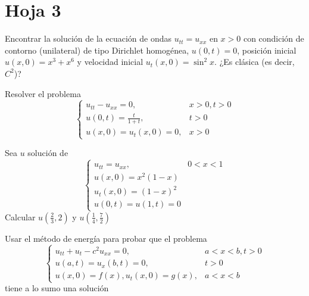 \section{Hoja 3}

\begin{problem}[1] Encontrar la solución de la ecuación de ondas $ u_{tt} = u_{xx} $ en $ x>0 $ con condición de contorno (unilateral) de tipo Dirichlet homogénea, $ u(0,t)=0 $, posición inicial $ u(x,0)=x^3+x^6 $ y velocidad inicial $ u_t(x,0)=\sin^2x $. ¿Es clásica (es decir, $ C^2 $)?

\solution

\end{problem}





\begin{problem}[2] Resolver el problema \[ \begin{cases}
	u_{tt} - u_{xx} = 0,    & x>0, t>0 \\
	u(0,t) = \frac{t}{1+t}, & t>0 \\
	u(x,0)=u_t(x,0)=0 ,     & x>0
\end{cases} \]

\solution

\end{problem}





\begin{problem}[3] Sea $ u $ solución de
\[ \begin{cases}
	 u_{tt} = u_{xx}, & 0<x<1 \\
	 u(x,0)=x^2(1-x) & \\
	 u_t(x,0) = (1-x)^2 & \\
	 u(0,t)=u(1,t)=0
\end{cases} 
\] Calcular $ u(\frac{2}{3},2) $ y $ u(\frac{1}{4},\frac{7}{2}) $


\solution

\end{problem}





\begin{problem}[4] Usar el método de energía para probar que el problema
\[ \begin{cases}
	u_{tt}+u_t-c^2u_{xx} =0,    & a<x<b, t>0\\
	u(a,t)=u_x(b,t)=0,          & t>0\\
	u(x,0)=f(x), u_t(x,0)=g(x), & a<x<b
\end{cases}
\]
tiene a lo sumo una solución

\solution

\end{problem}





